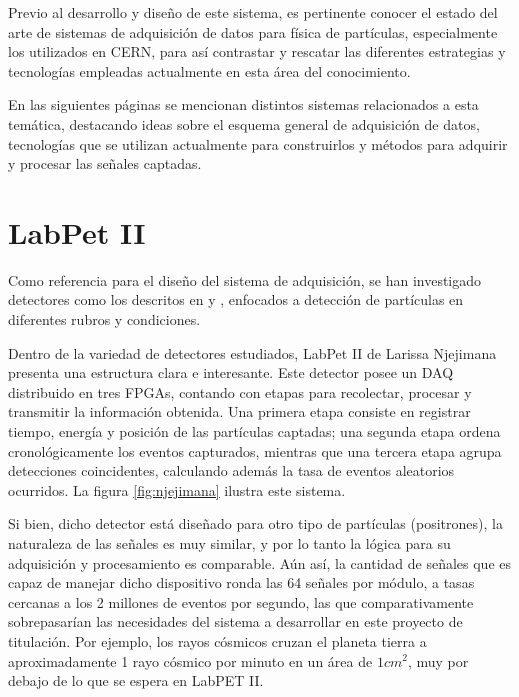 Previo al desarrollo y diseño de este sistema, es pertinente conocer el estado del arte de sistemas de adquisición de datos para física de partículas, especialmente los utilizados en CERN, para así contrastar y rescatar las diferentes estrategias y tecnologías empleadas actualmente en esta área del conocimiento.

En las siguientes páginas se mencionan distintos sistemas relacionados a esta temática, destacando ideas sobre el esquema general de adquisición de datos, tecnologías que se utilizan actualmente para construirlos y  métodos para adquirir y procesar las señales captadas.

\section{LabPet II}

	Como referencia para el diseño del sistema de adquisición, se han investigado detectores como los descritos en \cite{Basiladze2017Methods1} y \cite{Basiladze2017Methods2}, enfocados a detección de partículas en diferentes rubros y condiciones.
	
	Dentro de la variedad de detectores estudiados, LabPet II de Larissa Njejimana \cite{Njejimana2013DesignImaging} presenta una estructura clara e interesante. Este detector posee un DAQ distribuido en tres FPGAs, contando con etapas para recolectar, procesar y transmitir la información obtenida. Una primera etapa consiste en registrar tiempo, energía y posición de las partículas captadas; una segunda etapa ordena cronológicamente los eventos capturados, mientras que una tercera etapa agrupa detecciones coincidentes, calculando además la tasa de eventos aleatorios ocurridos. La figura \ref{fig:njejimana} ilustra este sistema.
	
	Si bien, dicho detector está diseñado para otro tipo de partículas (positrones), la naturaleza de las señales es muy similar, y por lo tanto la lógica para su adquisición y procesamiento es comparable. Aún así, la cantidad de señales que es capaz de manejar dicho dispositivo ronda las 64 señales por módulo, a tasas cercanas a los 2 millones de eventos por segundo, las que comparativamente sobrepasarían las necesidades del sistema a desarrollar en este proyecto de titulación. Por ejemplo, los rayos cósmicos cruzan el planeta tierra a aproximadamente 1 rayo cósmico por minuto en un área de $1cm^2$, muy por debajo de lo que se espera en LabPET II.
	
